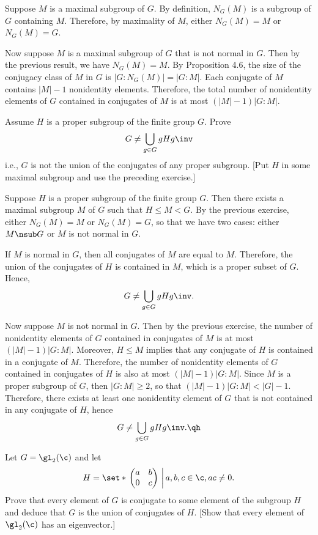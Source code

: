 \begin{sol}
	Suppose $M$ is a maximal subgroup of $G$. By definition, $N_G(M)$ is a subgroup of $G$ containing $M$. Therefore, by maximality of $M$, either $N_G(M) = M$ or $N_G(M) = G$.

	Now suppose $M$ is a maximal subgroup of $G$ that is not normal in $G$. Then by the previous result, we have $N_G(M) = M$. By Proposition 4.6, the size of the conjugacy class of $M$ in $G$ is $|G : N_G(M)| = |G : M|$. Each conjugate of $M$ contains $|M| - 1$ nonidentity elements. Therefore, the total number of nonidentity elements of $G$ contained in conjugates of $M$ is at most $(|M| - 1)|G : M|$.
\end{sol}

\newpage

\begin{exercise}\label{ex4.3.24}
	Assume $H$ is a proper subgroup of the finite group $G$. Prove
	\[G \neq \bigcup_{g \in G} gHg\inv\]
	i.e., $G$ is not the union of the conjugates of any proper subgroup. [Put $H$ in some maximal subgroup and use the preceding exercise.]
\end{exercise}

\begin{sol}
	Suppose $H$ is a proper subgroup of the finite group $G$. Then there exists a maximal subgroup $M$ of $G$ such that $H \leq M < G$. By the previous exercise, either $N_G(M) = M$ or $N_G(M) = G$, so that we have two cases: either $M \nsub G$ or $M$ is not normal in $G$.

	If $M$ is normal in $G$, then all conjugates of $M$ are equal to $M$. Therefore, the union of the conjugates of $H$ is contained in $M$, which is a proper subset of $G$. Hence, 
	\[G \neq \bigcup_{g \in G} gHg\inv.\]
	
	
	Now suppose $M$ is not normal in $G$. Then by the previous exercise, the number of nonidentity elements of $G$ contained in conjugates of $M$ is at most $(|M| - 1)|G : M|$. Moreover, $H \leq M$ implies that any conjugate of $H$ is contained in a conjugate of $M$. Therefore, the number of nonidentity elements of $G$ contained in conjugates of $H$ is also at most $(|M| - 1)|G : M|$. Since $M$ is a proper subgroup of $G$, then $|G : M| \geq 2$, so that $(|M| - 1)|G : M| < |G| - 1$. Therefore, there exists at least one nonidentity element of $G$ that is not contained in any conjugate of $H$, hence
	\[G \neq \bigcup_{g \in G} gHg\inv. \qh\]
\end{sol}

\begin{exercise}\label{ex4.3.25}
	Let $G = \gl_2(\c)$ and let
	\[H = \set*{\left.
		\begin{pmatrix}
			a & b \\
			0 & c
		\end{pmatrix}~\right| a, b, c \in \c, ac \neq 0
	}.\]
	Prove that every element of $G$ is conjugate to some element of the subgroup $H$ and deduce that $G$ is the union of conjugates of $H$. [Show that every element of $\gl_2(\c)$ has an eigenvector.]
\end{exercise}

